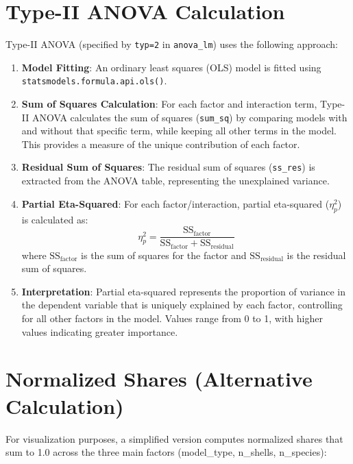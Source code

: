 \documentclass[11pt]{article}
\begin{document}
\section{Type-II ANOVA Calculation}

Type-II ANOVA (specified by \texttt{typ=2} in \texttt{anova\_lm}) uses the following approach:

\begin{enumerate}
    \item \textbf{Model Fitting}: An ordinary least squares (OLS) model is fitted using \texttt{statsmodels.formula.api.ols()}.
    
    \item \textbf{Sum of Squares Calculation}: For each factor and interaction term, Type-II ANOVA calculates the sum of squares (\texttt{sum\_sq}) by comparing models with and without that specific term, while keeping all other terms in the model. This provides a measure of the unique contribution of each factor.
    
    \item \textbf{Residual Sum of Squares}: The residual sum of squares (\texttt{ss\_res}) is extracted from the ANOVA table, representing the unexplained variance.
    
    \item \textbf{Partial Eta-Squared}: For each factor/interaction, partial eta-squared ($\eta_p^2$) is calculated as:
    \begin{equation}
    \eta_p^2 = \frac{\text{SS}_{\text{factor}}}{\text{SS}_{\text{factor}} + \text{SS}_{\text{residual}}}
    \end{equation}
    where $\text{SS}_{\text{factor}}$ is the sum of squares for the factor and $\text{SS}_{\text{residual}}$ is the residual sum of squares.
    
    \item \textbf{Interpretation}: Partial eta-squared represents the proportion of variance in the dependent variable that is uniquely explained by each factor, controlling for all other factors in the model. Values range from 0 to 1, with higher values indicating greater importance.
\end{enumerate}

\section{Normalized Shares (Alternative Calculation)}

For visualization purposes, a simplified version computes normalized shares that sum to 1.0 across the three main factors (model\_type, n\_shells, n\_species):
\end{document}
